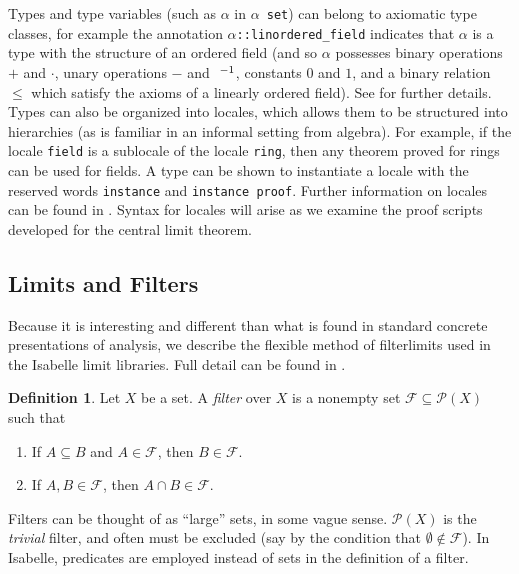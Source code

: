\documentclass[leqno]{article}
\theoremstyle{definition}
\newtheorem{definition}[theorem]{Definition}
\begin{document}
Types and type variables (such as $\alpha$ in \texttt{$\alpha$ set}) can belong to axiomatic type classes, for example the annotation \texttt{$\alpha$::linordered\_field} indicates that $\alpha$ is a type with the structure of an ordered field (and so $\alpha$ possesses binary operations $+$ and $\cdot$, unary operations $-$ and $\phantom{t}^{-1}$, constants $0$ and $1$, and a binary relation $\le$ which satisfy the axioms of a linearly ordered field). See \cite{haftmann} for further details. Types can also be organized into locales, which allows them to be structured into hierarchies (as is familiar in an informal setting from algebra). For example, if the locale \texttt{field} is a sublocale of the locale \texttt{ring}, then any theorem proved for rings can be used for fields. A type can be shown to instantiate a locale with the reserved words \texttt{instance} and \texttt{instance proof}. Further information on locales can be found in \cite{ballarin}. Syntax for locales will arise as we examine the proof scripts developed for the central limit theorem.

\subsection{Limits and Filters} \label{sec:filterlim}

Because it is interesting and different than what is found in standard concrete presentations of analysis, we describe the flexible method of filterlimits used in the Isabelle limit libraries. Full detail can be found in \cite{hoelzl-filter}.

\begin{definition}
Let $X$ be a set. A {\em filter} over $X$ is a nonempty set $\mathcal F \subseteq \mathcal P(X)$ such that
\begin{enumerate}
\item If $A \subseteq B$ and $A \in \mathcal F$, then $B \in \mathcal F$.
\item If $A, B \in \mathcal F$, then $A \cap B \in \mathcal F$.
\end{enumerate}
\end{definition}

Filters can be thought of as ``large'' sets, in some vague sense. $\mathcal P(X)$ is the {\em trivial} filter, and often must be excluded (say by the condition that $\emptyset \notin \mathcal F$). In Isabelle, predicates are employed instead of sets in the definition of a filter.
\end{document}
